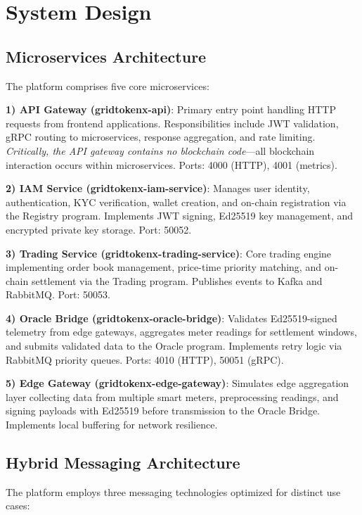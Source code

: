 \documentclass[conference]{IEEEtran}
\begin{document}
\section{System Design}

\subsection{Microservices Architecture}

The platform comprises five core microservices:

\textbf{1) API Gateway (gridtokenx-api)}: Primary entry point handling HTTP requests from frontend applications. Responsibilities include JWT validation, gRPC routing to microservices, response aggregation, and rate limiting. \textit{Critically, the API gateway contains no blockchain code}---all blockchain interaction occurs within microservices. Ports: 4000 (HTTP), 4001 (metrics).

\textbf{2) IAM Service (gridtokenx-iam-service)}: Manages user identity, authentication, KYC verification, wallet creation, and on-chain registration via the Registry program. Implements JWT signing, Ed25519 key management, and encrypted private key storage. Port: 50052.

\textbf{3) Trading Service (gridtokenx-trading-service)}: Core trading engine implementing order book management, price-time priority matching, and on-chain settlement via the Trading program. Publishes events to Kafka and RabbitMQ. Port: 50053.

\textbf{4) Oracle Bridge (gridtokenx-oracle-bridge)}: Validates Ed25519-signed telemetry from edge gateways, aggregates meter readings for settlement windows, and submits validated data to the Oracle program. Implements retry logic via RabbitMQ priority queues. Ports: 4010 (HTTP), 50051 (gRPC).

\textbf{5) Edge Gateway (gridtokenx-edge-gateway)}: Simulates edge aggregation layer collecting data from multiple smart meters, preprocessing readings, and signing payloads with Ed25519 before transmission to the Oracle Bridge. Implements local buffering for network resilience.

\subsection{Hybrid Messaging Architecture}

The platform employs three messaging technologies optimized for distinct use cases:
\end{document}
